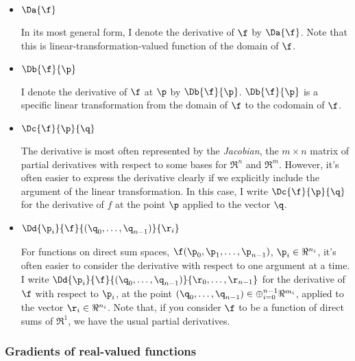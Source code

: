 \begin{itemize}

\item $\Da{\f}$

In its most general form,
I denote the derivative of $\f$ by $\Da{\f}$.
Note that this is
linear-transformation-valued function of the domain of $\f$.

\item $\Db{\f}{\p}$

I denote the derivative of $\f$ at $\p$ by $\Db{\f}{\p}$.
$\Db{\f}{\p}$ is a specific linear transformation from
the domain of $\f$ to the codomain of $\f$.

\item $\Dc{\f}{\p}{\q}$

The derivative is most often represented by the {\it Jacobian},
the $m \times n$ matrix of partial derivatives
with respect to some bases for $\Re^n$ and $\Re^m$.
However, it's often easier to express the derivative clearly if we
explicitly include the argument of the linear transformation.
In this case, I write $\Dc{\f}{\p}{\q}$
for the derivative of $f$ at the point $\p$
applied to the vector $\q$.

\item $\Dd{\p_i}{\f}{(\q_0,\ldots,\q_{n-1})}{\r_i}$

For functions on direct sum spaces,
$\f(\p_0,\p_1,\ldots,\p_{n-1})$, $\p_i \in \Re^{n_i}$,
it's often easier to consider the derivative
with respect to one argument at a time.
I write $\Dd{\p_i}{\f}{(\q_0,\ldots,\q_{n-1})}{\r_0,\ldots,\r_{n-1}}$
for the derivative of $\f$ with respect to $\p_i$,
at the point $(\q_0,\ldots,\q_{n-1}) \in \oplus_{i=0}^{n-1} \Re^{m_i}$,
applied to the vector $\r_i \in \Re^{n_i}$.
Note that, if you consider $\f$ to be a function
of direct sums of $\Re^1$, we have the usual
partial derivatives.

\end{itemize}



\subsubsection{Gradients of real-valued functions}
\label{sec:gradients}


